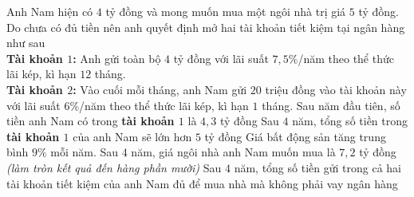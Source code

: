 \begin{ex}%
	Anh Nam hiện có $4$ tỷ đồng và mong muốn mua một ngôi nhà trị giá $5$ tỷ đồng. Do chưa có đủ tiền nên anh quyết định mở hai tài khoản tiết kiệm tại ngân hàng như sau\\ 
	\textbf{Tài khoản $1$:} Anh gửi toàn bộ $4$ tỷ đồng với lãi suất $7{,}5\%$/năm theo thể thức lãi kép, kì hạn $12$ tháng.\\ 
	\textbf{Tài khoản $2$:} Vào cuối mỗi tháng, anh Nam gửi $20$ triệu đồng vào tài khoản này với lãi suất $6\%$/năm theo thể thức lãi kép, kì hạn $1$ tháng.
	\choiceTF 
	{\True Sau năm đầu tiên, số tiền anh Nam có trong \textbf{tài khoản $1$} là $4{,}3$ tỷ đồng}
	{\True Sau $4$ năm, tổng số tiền trong \textbf{tài khoản $1$} của anh Nam sẽ lớn hơn $5$ tỷ đồng}
	{Giá bất động sản tăng trung bình $9\%$ mỗi năm. Sau $4$ năm, giá ngôi nhà anh Nam muốn mua là $7{,}2$ tỷ đồng \textit{(làm tròn kết quả đến hàng phần mười)}}
	{Sau $4$ năm, tổng số tiền gửi trong cả hai tài khoản tiết kiệm của anh Nam đủ để mua nhà mà không phải vay ngân hàng}
\end{ex}

